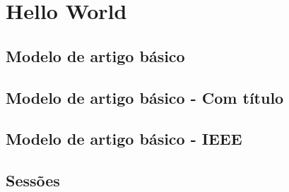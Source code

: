 \section{Hello World}

\subsection*{Modelo de artigo básico}
\begin{frame}
\begin{CenteredBox}
	
\end{CenteredBox}
\end{frame}

\subsection*{Modelo de artigo básico - Com título}
\begin{frame}
\begin{CenteredBox}
	
\end{CenteredBox}
\end{frame}

\subsection*{Modelo de artigo básico - IEEE}
\begin{frame}
\begin{CenteredBox}
	
\end{CenteredBox}
\end{frame}

\subsection*{Sessões} %
\label{sub:sess_es}
\begin{frame}
\begin{CenteredBox}
	
\end{CenteredBox}
\end{frame}

